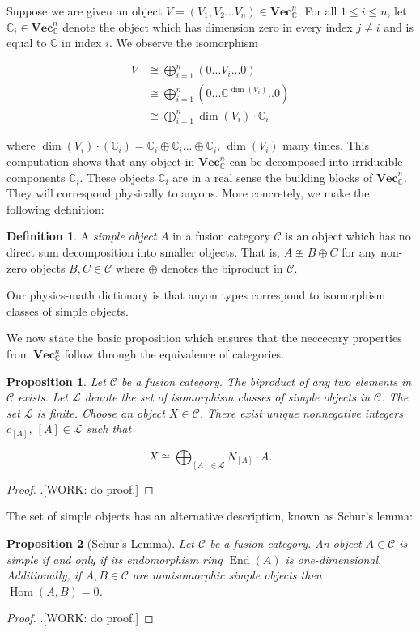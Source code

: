 \documentclass{article}
\newtheorem{proposition}{Proposition}[section]
\theoremstyle{definition}
\newtheorem*{definition}{Definition}
\DeclareMathOperator{\Hom}{Hom}
\DeclareMathOperator{\End}{End}
\newcommand{\CC}{\mathbb{C}}
\newcommand{\C}{\mathscr{C}}
\newcommand{\LL}{\mathcal{L}}
\newcommand{\0}{\left|0\right>}
\newcommand{\1}{\left|1\right>}
\renewcommand{\Vec}{\mathbf{Vec}}
\numberwithin{figure}{section}
\begin{document}
Suppose we are given an object $V=(V_1,V_2...V_n)\in \Vec_\CC^n$. For all $1\leq i\leq n$, let  $\CC_i\in \Vec_\CC^n$ denote the object which has dimension zero in every index $j\neq i$ and is equal to $\CC$ in index $i$. We observe the isomorphism

\begin{align*}
V& \cong \bigoplus_{i=1}^n (0... V_i ... 0)\\
& \cong \bigoplus_{i=1}^n (0... \CC^{\dim (V_i)}.. 0)\\
& \cong \bigoplus_{i=1}^n \dim(V_i)\cdot \CC_i
\end{align*}

where $\dim(V_i)\cdot (\CC_i)=\CC_i\oplus \CC_i...\oplus \CC_i$, $\dim(V_i)$ many times. This computation shows that any object in $\Vec_\CC^n$ can be decomposed into irriducible components $\CC_i$. These objects $\CC_i$ are in a real sense the building blocks of $\Vec_\CC^n$. They will correspond physically to anyons. More concretely, we make the following definition:

\begin{definition} A \textit{simple object} $A$ in a fusion category $\C$ is an object which has no direct sum decomposition into smaller objects. That is, $A\ncong B\oplus C$ for any non-zero objects $B,C\in \C$ where $\oplus$ denotes the biproduct in $\C$.
\end{definition}

Our physics-math dictionary is that anyon types correspond to isomorphism classes of simple objects.

We now state the basic proposition which ensures that the neccecary properties from $\Vec_\CC^n$ follow through the equivalence of categories.

\begin{proposition} Let $\C$ be a fusion category. The biproduct of any two elements in $\C$ exists. Let $\LL$ denote the set of isomorphism classes of simple objects in $\C$. The set $\LL$ is finite. Choose an object $X\in \C$. There exist unique nonnegative integers $c_{[A]}$, $[A]\in \LL$ such that 

$$X\cong \bigoplus_{[A]\in \LL}N_{[A]}\cdot A.$$
\end{proposition}
\begin{proof}.[WORK: do proof.]
\end{proof}

The set of simple objects has an alternative description, known as Schur's lemma:

\begin{proposition}[Schur's Lemma] Let $\C$ be a fusion category. An object $A\in \C$ is simple if and only if its endomorphism ring $\End(A)$ is one-dimensional. Additionally, if $A,B\in \C$ are nonisomorphic simple objects then $\Hom(A,B)=0$.
\end{proposition}
\begin{proof}.[WORK: do proof.]
\end{proof}
\end{document}
